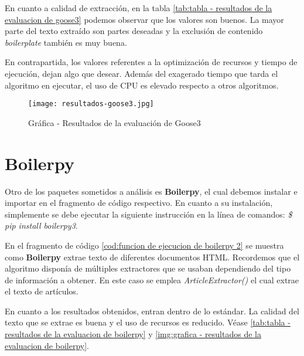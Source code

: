 En cuanto a calidad de extracción, en la tabla \ref{tab:tabla - resultados de la evaluacion de goose3}
podemos observar que los valores son buenos. La mayor parte del texto extraído son partes deseadas y la 
exclusión de contenido \emph{boilerplate} también es muy buena.

En contrapartida, los valores referentes a la optimización de recursos y tiempo de ejecución, dejan algo
que desear. Además del exagerado tiempo que tarda el algoritmo en ejecutar, el uso de CPU es elevado
respecto a otros algoritmos.

\begin{figure}[tphb]
    \centering
    \texttt{[image: resultados-goose3.jpg]}
    \caption{Gráfica - Resultados de la evaluación de Goose3}
    \label{img:grafica - resultados de la evaluacion de goose3}
\end{figure}

\section*{Boilerpy}

Otro de los paquetes sometidos a análisis es \textbf{Boilerpy}, el cual debemos instalar e importar en el 
fragmento de código respectivo. En cuanto a su instalación, simplemente se debe ejecutar la siguiente 
instrucción en la línea de comandos: \emph{\$ pip install boilerpy3}.

\begin{codefloat}
    
    \caption{Función de ejecución de Boilerpy}
    \label{cod:funcion de ejecucion de boilerpy 2}
\end{codefloat}

En el fragmento de código \ref{cod:funcion de ejecucion de boilerpy 2} se muestra como \textbf{Boilerpy}
extrae texto de diferentes documentos HTML. Recordemos que el algoritmo disponía de múltiples extractores
que se usaban dependiendo del tipo de información a obtener. En este caso se emplea \emph{ArticleExtractor()}
el cual extrae el texto de artículos.

En cuanto a los resultados obtenidos, entran dentro de lo estándar. La calidad del texto que se extrae es
buena y el uso de recursos es reducido. Véase \ref{tab:tabla - resultados de la evaluacion de boilerpy} y 
\ref{img:grafica - resultados de la evaluacion de boilerpy}.

